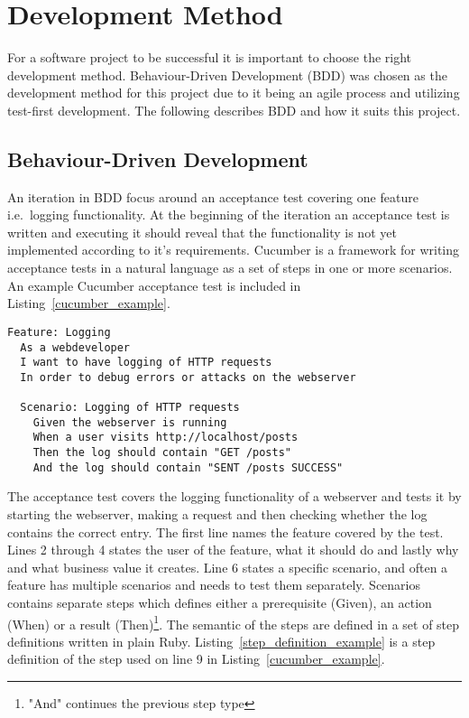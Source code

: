 \section{Development Method} %
\label{sec:development}

For a software project to be successful it is important to choose the right
development method. Behaviour-Driven Development (BDD) was chosen as the
development method for this project due to it being an agile process and
utilizing test-first development. The following describes BDD and how it suits
this project.

\subsection{Behaviour-Driven Development}


An iteration in BDD focus around an acceptance test covering one feature i.e.\
logging functionality. At the beginning of the iteration an acceptance test is
written and executing it should reveal that the functionality is not yet
implemented according to it's requirements. Cucumber is a framework for writing
acceptance tests in a natural language as a set of steps in one or more scenarios.
An example Cucumber acceptance test is included in
Listing~\ref{cucumber_example}.

\bigskip
\begin{lstlisting}[label=cucumber_example,caption=Cucumber acceptance test example.]
Feature: Logging
  As a webdeveloper
  I want to have logging of HTTP requests
  In order to debug errors or attacks on the webserver

  Scenario: Logging of HTTP requests
    Given the webserver is running
    When a user visits http://localhost/posts
    Then the log should contain "GET /posts"
    And the log should contain "SENT /posts SUCCESS"
\end{lstlisting}

The acceptance test covers the logging functionality of a webserver and tests it
by starting the webserver, making a request and then checking whether the log
contains the correct entry.  The first line names the feature covered by the
test. Lines 2 through 4 states the user of the feature, what it should do and
lastly why and what business value it creates. Line 6 states a specific
scenario, and often a feature has multiple scenarios and needs to test them
separately. Scenarios contains separate steps which defines either a
prerequisite (Given), an action (When) or a result (Then)\footnote{"And"
continues the previous step type}. The semantic of the steps are defined in a
set of step definitions written in plain Ruby.
Listing~\ref{step_definition_example} is a step definition of the step used on
line 9 in Listing~\ref{cucumber_example}.

